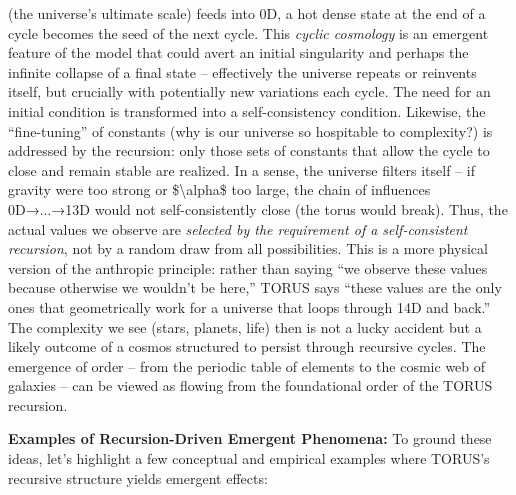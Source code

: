 \documentclass[]{article}
\begin{document}
\begin{itemize}
  (the universe's ultimate scale) feeds into 0D, a hot dense state at
  the end of a cycle becomes the seed of the next cycle​. This
  \emph{cyclic cosmology} is an emergent feature of the model that could
  avert an initial singularity and perhaps the infinite collapse of a
  final state -- effectively the universe repeats or reinvents itself,
  but crucially with potentially new variations each cycle. The need for
  an initial condition is transformed into a self-consistency condition.
  Likewise, the ``fine-tuning'' of constants (why is our universe so
  hospitable to complexity?) is addressed by the recursion: only those
  sets of constants that allow the cycle to close and remain stable are
  realized​. In a sense, the universe filters itself -- if gravity were
  too strong or \$\textbackslash{}alpha\$ too large, the chain of
  influences 0D→...→13D would not self-consistently close (the torus
  would break). Thus, the actual values we observe are \emph{selected by
  the requirement of a self-consistent recursion}, not by a random draw
  from all possibilities​. This is a more physical version of the
  anthropic principle: rather than saying ``we observe these values
  because otherwise we wouldn't be here,'' TORUS says ``these values are
  the only ones that geometrically work for a universe that loops
  through 14D and back.'' The complexity we see (stars, planets, life)
  then is not a lucky accident but a likely outcome of a cosmos
  structured to persist through recursive cycles. The emergence of order
  -- from the periodic table of elements to the cosmic web of galaxies
  -- can be viewed as flowing from the foundational order of the TORUS
  recursion.
\end{itemize}

\textbf{Examples of Recursion-Driven Emergent Phenomena:} To ground
these ideas, let's highlight a few conceptual and empirical examples
where TORUS's recursive structure yields emergent effects:
\end{document}
